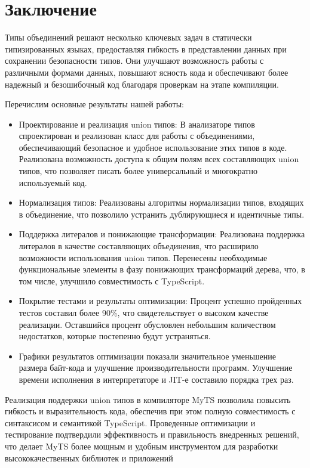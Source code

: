 \section{Заключение}
\label{sec:Chapter5} 

Типы объединений решают несколько ключевых задач в статически типизированных языках, предоставляя гибкость
в представлении данных при сохранении безопасности типов.
Они улучшают возможность работы с различными формами данных, повышают ясность кода и обеспечивают более надежный и
безошибочный код благодаря проверкам на этапе компиляции.

Перечислим основные результаты нашей работы:
\begin{itemize}[left=2em]
    \item Проектирование и реализация union типов:
В анализаторе типов спроектирован и реализован класс для работы с объединениями, обеспечивающий безопасное и удобное
использование этих типов в коде.
Реализована возможность доступа к общим полям всех составляющих union типов, что позволяет писать более универсальный
и многократно используемый код.

    \item Нормализация типов:
Реализованы алгоритмы нормализации типов, входящих в объединение, что позволило устранить дублирующиеся и идентичные типы.

    \item Поддержка литералов и понижающие трансформации:
Реализована поддержка литералов в качестве составляющих объединения, что расширило возможности использования union типов.
Перенесены необходимые функциональные элементы в фазу понижающих трансформаций дерева, что, в том числе,
улучшило совместимость с TypeScript.

    \item Покрытие тестами и результаты оптимизации:
Процент успешно пройденных тестов составил более 90\%, что свидетельствует о высоком качестве реализации.
Оставшийся процент обусловлен небольшим количеством недостатков, которые постепенно будут устраняться.
    \item
Графики результатов оптимизации показали значительное уменьшение размера байт-кода и улучшение производительности программ.
Улучшение времени исполнения в интерпретаторе и JIT-е составило порядка трех раз.
\end{itemize}

Реализация поддержки union типов в компиляторе MyTS позволила повысить гибкость и выразительность кода, обеспечив при
этом полную совместимость с синтаксисом и семантикой TypeScript.
Проведенные оптимизации и тестирование подтвердили эффективность и правильность внедренных решений,
что делает MyTS более мощным и удобным инструментом для разработки высококачественных библиотек и приложений

\newpage
